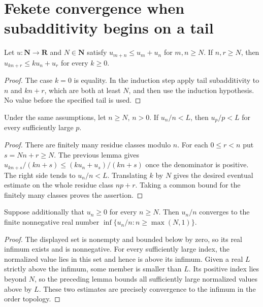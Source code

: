 \section{Fekete convergence when subadditivity begins on a tail}

\begin{lemma}\label{lem:tail-subadditive-arithmetic}
\leanok
{}
Let $u:\mathbf N\to\mathbf R$ and $N\in\mathbf N$ satisfy
$u_{m+n}\leq u_m+u_n$ for $m,n\geq N$.
If $n,r\geq N$, then $u_{kn+r}\leq ku_n+u_r$ for every $k\geq0$.
\end{lemma}
\begin{proof}
The case $k=0$ is equality. In the induction step apply tail subadditivity
to $n$ and $kn+r$, which are both at least $N$, and then use the induction
hypothesis. No value before the specified tail is used.
\end{proof}

\begin{lemma}\label{lem:tail-subadditive-eventual-upper-bound}
\leanok
{}
Under the same assumptions, let $n\geq N$, $n>0$. If $u_n/n<L$, then
$u_p/p<L$ for every sufficiently large $p$.
\end{lemma}
\begin{proof}
There are finitely many residue classes modulo $n$. For each $0\leq r<n$
put $s=Nn+r\geq N$. The previous lemma gives
$u_{kn+s}/(kn+s)\leq(ku_n+u_s)/(kn+s)$ once the denominator is positive.
The right side tends to $u_n/n<L$. Translating $k$ by $N$ gives the desired
eventual estimate on the whole residue class $np+r$. Taking a common bound
for the finitely many classes proves the assertion.
\end{proof}

\begin{theorem}\label{thm:tail-subadditive-fekete}
\leanok
{}
Suppose additionally that $u_n\geq0$ for every $n\geq N$.
Then $u_n/n$ converges to the finite nonnegative real number
$\inf\{u_n/n:n\geq\max(N,1)\}$.
\end{theorem}
\begin{proof}
The displayed set is nonempty and bounded below by zero, so its real
infimum exists and is nonnegative. For every sufficiently large index,
the normalized value lies in this set and hence is above its infimum.
Given a real $L$ strictly above the infimum, some member is smaller than
$L$. Its positive index lies beyond $N$, so the preceding lemma bounds
all sufficiently large normalized values above by $L$. These two estimates
are precisely convergence to the infimum in the order topology.
\end{proof}
